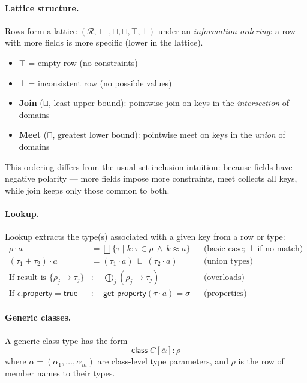 \paragraph{Lattice structure.}
Rows form a lattice $(\mathcal{R}, \sqsubseteq, \sqcup, \sqcap, \top, \bot)$ under an \emph{information ordering}: a row with more fields is more specific (lower in the lattice).
\begin{itemize}
  \item $\top$ = empty row (no constraints)
  \item $\bot$ = inconsistent row (no possible values)
  \item \textbf{Join} ($\sqcup$, least upper bound): pointwise join on keys in the \emph{intersection} of domains
  \item \textbf{Meet} ($\sqcap$, greatest lower bound): pointwise meet on keys in the \emph{union} of domains
\end{itemize}
This ordering differs from the usual set inclusion intuition: because fields have negative polarity --- more fields impose more constraints, meet collects all keys, while join keeps only those common to both.

\paragraph{Lookup.}
Lookup extracts the type(s) associated with a given key from a row or type:
\begin{align*}
\rho \cdot a &= \bigsqcup \{ \tau \mid k:\tau \in \rho \ \wedge\ k \approx a \}
  &&\text{(basic case; $\bot$ if no match)}\\
(\tau_1 + \tau_2) \cdot a &= (\tau_1 \cdot a) \ \sqcup\ (\tau_2 \cdot a)
  &&\text{(union types)} \\
\text{If result is }\{\rho_j \to \tau_j\} &: \quad \bigoplus_j (\rho_j \to \tau_j)
  &&\text{(overloads)}\\
\text{If }\epsilon.\mathsf{property} = \mathsf{true} &: \quad \mathsf{get\_property}(\tau \cdot a) = \sigma
  &&\text{(properties)}
\end{align*}

\paragraph{Generic classes.}
A generic class type has the form
\[
\mathsf{class}\; C[\overline{\alpha}] : \rho
\]
where $\overline{\alpha} = (\alpha_1,\dots,\alpha_m)$ are class-level type parameters, and $\rho$ is the row of member names to their types.


